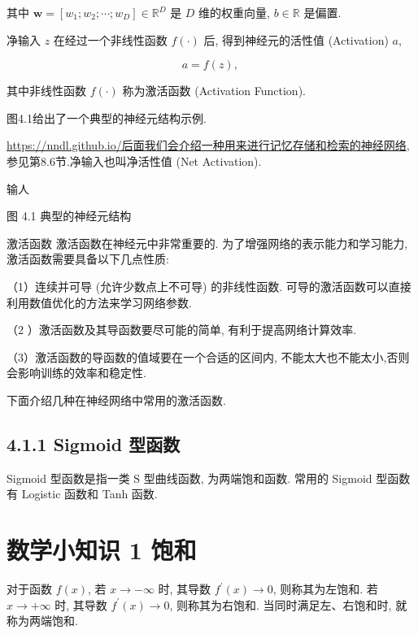 \documentclass[10pt]{article}
\begin{document}
其中 $\boldsymbol{w}=\left[w_{1} ; w_{2} ; \cdots ; w_{D}\right] \in \mathbb{R}^{D}$ 是 $D$ 维的权重向量, $b \in \mathbb{R}$ 是偏置.

净输入 $z$ 在经过一个非线性函数 $f(\cdot)$ 后, 得到神经元的活性值 (Activation) $a$,


\begin{equation*}
a=f(z) \text {, } \tag{4.3}
\end{equation*}


其中非线性函数 $f(\cdot)$ 称为激活函数 (Activation Function).

图4.1给出了一个典型的神经元结构示例.

\href{https://nndl.github.io/%E5%90%8E%E9%9D%A2%E6%88%91%E4%BB%AC%E4%BC%9A%E4%BB%8B%E7%BB%8D%E4%B8%80%E7%A7%8D%E7%94%A8%E6%9D%A5%E8%BF%9B%E8%A1%8C%E8%AE%B0%E5%BF%86%E5%AD%98%E5%82%A8%E5%92%8C%E6%A3%80%E7%B4%A2%E7%9A%84%E7%A5%9E%E7%BB%8F%E7%BD%91%E7%BB%9C}{https://nndl.github.io/后面我们会介绍一种用来进行记忆存储和检索的神经网络}, 参见第8.6节.净输入也叫净活性值 (Net Activation).



输人

图 4.1 典型的神经元结构

激活函数 激活函数在神经元中非常重要的. 为了增强网络的表示能力和学习能力, 激活函数需要具备以下几点性质:

（1）连续并可导 (允许少数点上不可导) 的非线性函数. 可导的激活函数可以直接利用数值优化的方法来学习网络参数.

（2 ）激活函数及其导函数要尽可能的简单, 有利于提高网络计算效率.

（3）激活函数的导函数的值域要在一个合适的区间内, 不能太大也不能太小,否则会影响训练的效率和稳定性.

下面介绍几种在神经网络中常用的激活函数.

\subsection*{4.1.1 Sigmoid 型函数}
Sigmoid 型函数是指一类 $\mathrm{S}$ 型曲线函数, 为两端饱和函数. 常用的 Sigmoid 型函数有 Logistic 函数和 Tanh 函数.

\section*{数学小知识 1 饱和}
对于函数 $f(x)$, 若 $x \rightarrow-\infty$ 时, 其导数 $f^{\prime}(x) \rightarrow 0$, 则称其为左饱和. 若 $x \rightarrow+\infty$ 时, 其导数 $f^{\prime}(x) \rightarrow 0$, 则称其为右饱和. 当同时满足左、右饱和时, 就称为两端饱和.
\end{document}
